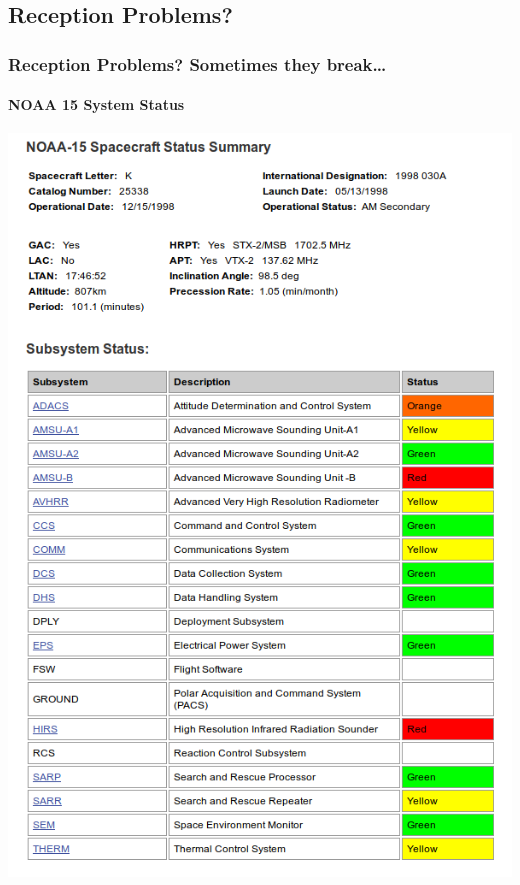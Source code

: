 \documentclass[]{beamer}
\begin{document}
\subsection{Reception Problems?}
\begin{frame}
    \frametitle{Reception Problems? Sometimes they break\dots}
    \framesubtitle{NOAA 15 System Status}
    \begin{center}
        \includegraphics[width=0.75\paperwidth,height=0.75\paperheight,keepaspectratio]{images/noaa-15-status.png}
    \end{center}
\end{frame}
\end{document}

